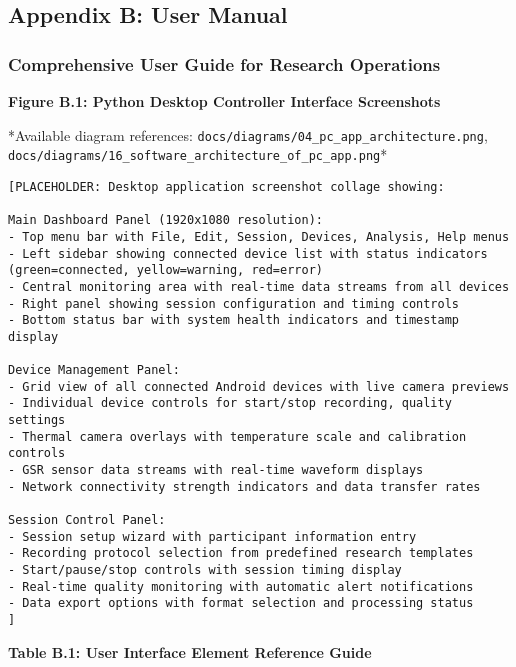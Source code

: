 \documentclass[12pt,a4paper]{article}
\begin{document}
\subsection{Appendix B: User Manual}

\subsubsection{Comprehensive User Guide for Research Operations}

\textbf{Figure B.1: Python Desktop Controller Interface Screenshots}

*Available diagram
references: \texttt{docs/diagrams/04\_pc\_app\_architecture.png}, \texttt{docs/diagrams/16\_software\_architecture\_of\_pc\_app.png}*

\begin{verbatim}
[PLACEHOLDER: Desktop application screenshot collage showing:

Main Dashboard Panel (1920x1080 resolution):
- Top menu bar with File, Edit, Session, Devices, Analysis, Help menus
- Left sidebar showing connected device list with status indicators (green=connected, yellow=warning, red=error)
- Central monitoring area with real-time data streams from all devices
- Right panel showing session configuration and timing controls
- Bottom status bar with system health indicators and timestamp display

Device Management Panel:
- Grid view of all connected Android devices with live camera previews
- Individual device controls for start/stop recording, quality settings
- Thermal camera overlays with temperature scale and calibration controls
- GSR sensor data streams with real-time waveform displays
- Network connectivity strength indicators and data transfer rates

Session Control Panel:
- Session setup wizard with participant information entry
- Recording protocol selection from predefined research templates
- Start/pause/stop controls with session timing display
- Real-time quality monitoring with automatic alert notifications
- Data export options with format selection and processing status
]
\end{verbatim}

\textbf{Table B.1: User Interface Element Reference Guide}
\end{document}
